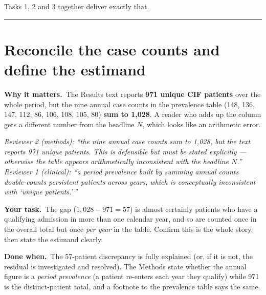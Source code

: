 \documentclass[11pt,a4paper]{article}
\newenvironment{reviewer}%
  {\def\FrameCommand{{\color{rulegray}\vrule width 1.5pt}\hspace{6pt}%
     \colorbox{quotebg}}%
   \MakeFramed{\advance\hsize-\width \FrameRestore}\small\itshape}%
  {\endMakeFramed}
\newcommand{\why}{\textbf{Why it matters.}\ }
\newcommand{\task}{\textbf{Your task.}\ }
\newcommand{\done}{\textbf{Done when.}\ }
\begin{document}
\noindent Tasks 1, 2 and 3 together deliver exactly that.

\medskip\hrule\medskip

\section{Reconcile the case counts and define the estimand}

\why The Results text reports \textbf{971 unique CIF patients} over the whole period, but the
nine annual case counts in the prevalence table (148, 136, 147, 112, 86, 106, 108, 105, 80)
\textbf{sum to 1{,}028}. A reader who adds up the column gets a different number from the
headline $N$, which looks like an arithmetic error.

\begin{reviewer}
Reviewer 2 (methods): ``the nine annual case counts sum to 1{,}028, but the text reports 971
unique patients. This is defensible but must be stated explicitly --- otherwise the table
appears arithmetically inconsistent with the headline $N$.''
\end{reviewer}
\begin{reviewer}
Reviewer 1 (clinical): ``a period prevalence built by summing annual counts double-counts
persistent patients across years, which is conceptually inconsistent with `unique patients.'\,''
\end{reviewer}

\task The gap ($1{,}028 - 971 = 57$) is almost certainly patients who have a qualifying
admission in more than one calendar year, and so are counted once in the overall total but once
\emph{per year} in the table. Confirm this is the whole story, then state the estimand clearly.


\done The 57-patient discrepancy is fully explained (or, if it is not, the residual is
investigated and resolved). The Methods state whether the annual figure is a \emph{period
prevalence} (a patient re-enters each year they qualify) while 971 is the distinct-patient
total, and a footnote to the prevalence table says the same.
\end{document}
